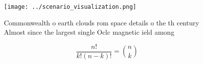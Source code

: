 \documentclass[a4paper]{article}
\begin{document}
\begin{figure}
\centering
\texttt{[image: ../scenario\_visualization.png]}
\caption{Commonwealth o earth clouds rom space details o the th century Almost since the largest single Oclc magnetic ield among
}
\end{figure}
 
\[ \frac{n!}{k!(n-k)!} = \binom{n}{k} \]
\end{document}
